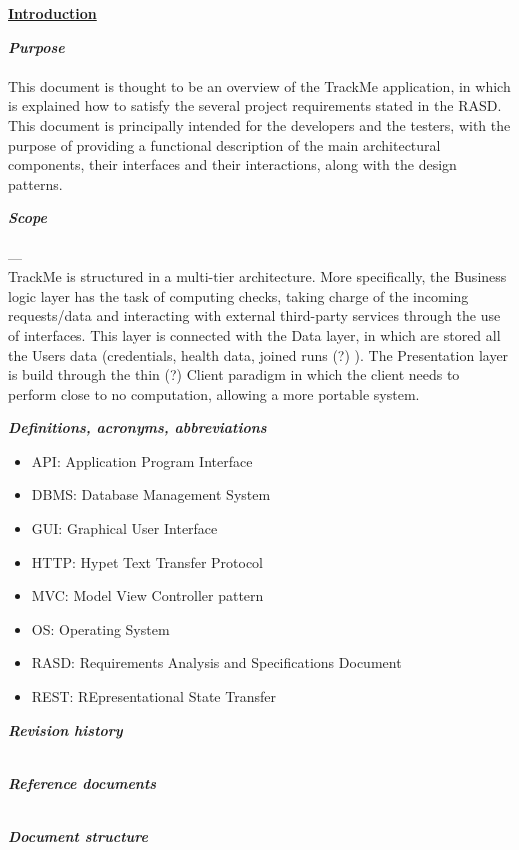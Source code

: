 \documentclass{report}
\begin{document}
	\underline{\textbf{Introduction} }
	\begin{legal}
    		\item \textit{\textbf{Purpose}}\\\\
		This document is thought to be an overview of the TrackMe application, in which is explained how to satisfy the several project requirements stated in the RASD. This document is principally intended for the developers and the testers, with the purpose of providing a functional description of the main architectural components, their interfaces and their interactions, along with the design patterns.
		\item \textit{\textbf{Scope}}\\\\
		---\\ 
		TrackMe is structured in a multi-tier architecture. More specifically, the Business logic layer has the task of computing checks, taking charge of the incoming requests/data and interacting with external third-party services through the use of interfaces. This layer is connected with the Data layer, in which are stored all the Users data (credentials, health data, joined runs (?) ). The Presentation layer is build through the thin (?) Client paradigm in which the client needs to perform close to no computation, allowing a more portable system.
		\item \textit{\textbf{Definitions, acronyms, abbreviations}}\\
			\begin{itemize}
			\item API: Application Program Interface
			\item DBMS: Database Management System
			\item GUI: Graphical User Interface
			\item HTTP: Hypet Text Transfer Protocol
			\item MVC: Model View Controller pattern
			\item OS: Operating System
			\item RASD: Requirements Analysis and Specifications Document
			\item REST: REpresentational State Transfer	
			\end{itemize}
		\item \textit{\textbf{Revision history}}\\\\
		\item \textit{\textbf{Reference documents}}\\\\
		\item \textit{\textbf{Document structure}}\\\\
  	\end{legal}
\end{document}
